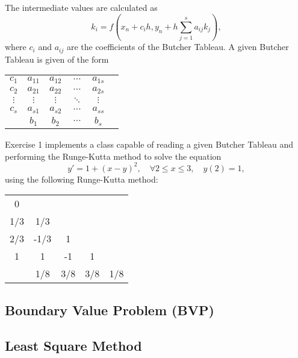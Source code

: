 The intermediate values are calculated as
\begin{equation}
    k_i = f(x_n + c_ih, y_n + h\sum_{j=1}^{s}a_{ij}k_j),
\end{equation}
where $c_i$ and $a_{ij}$ are the coefficients of the Butcher Tableau. A given Butcher Tableau is given of the form 
\begin{table}[H]
    \centering
    \begin{tabular}{c|ccccc}
        $c_1$ & $a_{11}$ & $a_{12}$ & $\cdots$ & $a_{1s}$ \\
        $c_2$ & $a_{21}$ & $a_{22}$ & $\cdots$ & $a_{2s}$ \\
        $\vdots$ & $\vdots$ & $\vdots$ & $\ddots$ & $\vdots$ \\
        $c_s$ & $a_{s1}$ & $a_{s2}$ & $\cdots$ & $a_{ss}$ \\
        \hline
        & $b_1$ & $b_2$ & $\cdots$ & $b_s$
    \end{tabular}
\end{table}

Exercise 1 implements a class capable of reading a given Butcher Tableau and performing the Runge-Kutta method to solve the equation
\begin{equation}
    y' = 1 + (x-y)^2, \quad \forall 2 \leq x \leq 3, \quad y(2) = 1,
\end{equation}
using the following Runge-Kutta method:
\begin{table}[H]
    \centering
    \begin{tabular}{c|cccc}
        0   \\
        1/3 & 1/3  \\
        2/3 & -1/3 & 1  \\
        1 & 1 & -1 & 1  \\
        \hline
        & 1/8 & 3/8 & 3/8 & 1/8
    \end{tabular}
\end{table}



\subsection{Boundary Value Problem (BVP)}\label{subsec:bvp}

\subsection{Least Square Method}\label{subsec:least_squares_method}